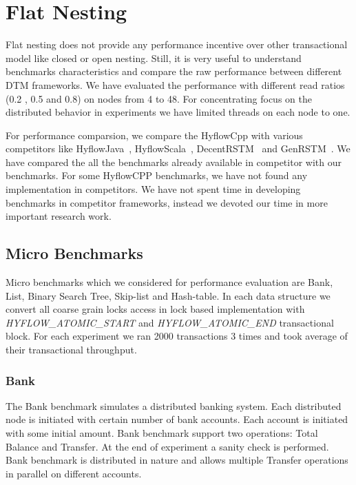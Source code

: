 \documentclass[12pt,english]{report}
\begin{document}
\section{Flat Nesting}

Flat nesting does not provide any performance incentive over other transactional model like closed or open nesting. Still, it is very useful to understand benchmarks characteristics and compare the raw performance between different DTM frameworks. We have evaluated the performance with different read ratios (0.2 , 0.5 and 0.8) on nodes from 4 to 48. For concentrating focus on the distributed behavior in experiments we have limited threads on each node to one.  

For performance comparsion, we compare the HyflowCpp with various competitors like HyflowJava~\cite{Saad:2011:HHP:1996130.1996167}, HyflowScala~\cite{turcuhyflow2}, DecentRSTM~\cite{DecentSTM:5470446} and GenRSTM~\cite{GenRSTM:6038614}. We have compared the all the benchmarks already available in competitor with our benchmarks. For some HyflowCPP benchmarks, we have not found any implementation in competitors. We have not spent time in developing benchmarks in competitor frameworks, instead we devoted our time in more important research work. 

\subsection{Micro Benchmarks}

Micro benchmarks which we considered for performance evaluation are Bank, List, Binary Search Tree, Skip-list and Hash-table. In each data structure we convert all coarse grain locks access in lock based implementation with \emph{HYFLOW{\_}ATOMIC{\_}START} and \emph{HYFLOW{\_}ATOMIC{\_}END} transactional block. For each experiment we ran 2000 transactions 3 times and took average of their transactional throughput.  

\subsubsection{Bank}

The Bank benchmark simulates a distributed banking system. Each distributed node is initiated with certain number of bank accounts. Each account is initiated with some initial amount. Bank benchmark support two operations: Total Balance and Transfer. At the end of experiment a sanity check is performed. Bank benchmark is distributed in nature and allows multiple Transfer operations in parallel on different accounts.
\end{document}
